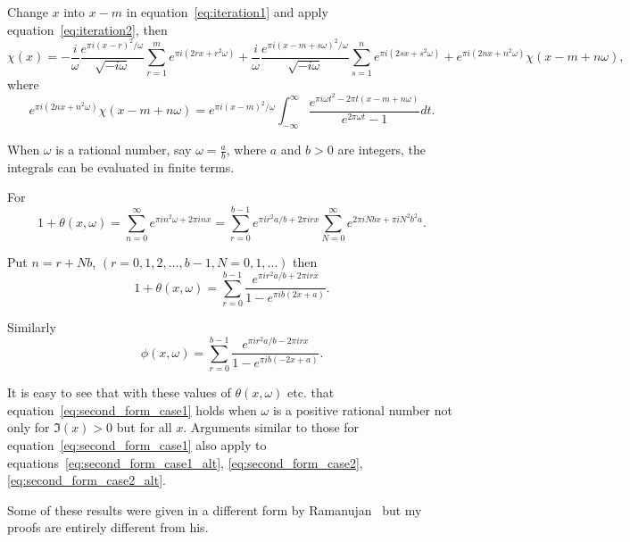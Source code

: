 \documentclass[12pt]{article}
\theoremstyle{remark}
\begin{document}
Change $x$ into $x-m$ in equation~\eqref{eq:iteration1} and apply equation~\eqref{eq:iteration2}, then
\begin{equation}\label{eq:iteration_combined}
\chi(x) = -\frac{i}{\omega} \frac{e^{\pi i(x-r)^2/\omega}}{\sqrt{-i\omega}} \sum_{r=1}^m e^{\pi i(2rx + r^2\omega)} + \frac{i}{\omega} \frac{e^{\pi i(x-m+s\omega)^2/\omega}}{\sqrt{-i\omega}} \sum_{s=1}^n e^{\pi i(2sx + s^2\omega)} + e^{\pi i(2nx + n^2\omega)} \chi(x - m + n\omega),
\end{equation}
where
\begin{equation}\label{eq:chi_bound}
e^{\pi i(2nx + n^2\omega)} \chi(x - m + n\omega) = e^{\pi i(x-m)^2/\omega} \int_{-\infty}^\infty \frac{e^{\pi i\omega t^2 - 2\pi t(x-m+n\omega)}}{e^{2\pi\omega t} - 1} dt.
\end{equation}

When $\omega$ is a rational number, say $\omega = \frac{a}{b}$, where $a$ and $b > 0$ are integers, the integrals can be evaluated in finite terms.

For
\begin{equation}\label{eq:rational_sum1}
1 + \theta(x, \omega) = \sum_{n=0}^\infty e^{\pi in^2\omega + 2\pi inx} = \sum_{r=0}^{b-1} e^{\pi ir^2a/b + 2\pi irx} \sum_{N=0}^\infty e^{2\pi iNbx + \pi iN^2b^2a}.
\end{equation}

Put $n = r + Nb$, $(r = 0, 1, 2, \ldots, b-1, N = 0, 1, \ldots)$ then
\begin{equation}\label{eq:rational_sum2}
1 + \theta(x, \omega) = \sum_{r=0}^{b-1} \frac{e^{\pi ir^2a/b + 2\pi irx}}{1 - e^{\pi ib(2x+a)}}.
\end{equation}

Similarly
\begin{equation}\label{eq:rational_sum3}
\phi(x, \omega) = \sum_{r=0}^{b-1} \frac{e^{\pi ir^2a/b - 2\pi irx}}{1 - e^{\pi ib(-2x+a)}}.
\end{equation}

It is easy to see that with these values of $\theta(x, \omega)$ etc. that equation~\eqref{eq:second_form_case1} holds when $\omega$ is a positive rational number not only for $\Im(x) > 0$ but for all $x$. Arguments similar to those for equation~\eqref{eq:second_form_case1} also apply to equations~\eqref{eq:second_form_case1_alt}, \eqref{eq:second_form_case2}, \eqref{eq:second_form_case2_alt}.

Some of these results were given in a different form by Ramanujan~\cite{Ramanujan1915b} but my proofs are entirely different from his.
\end{document}
